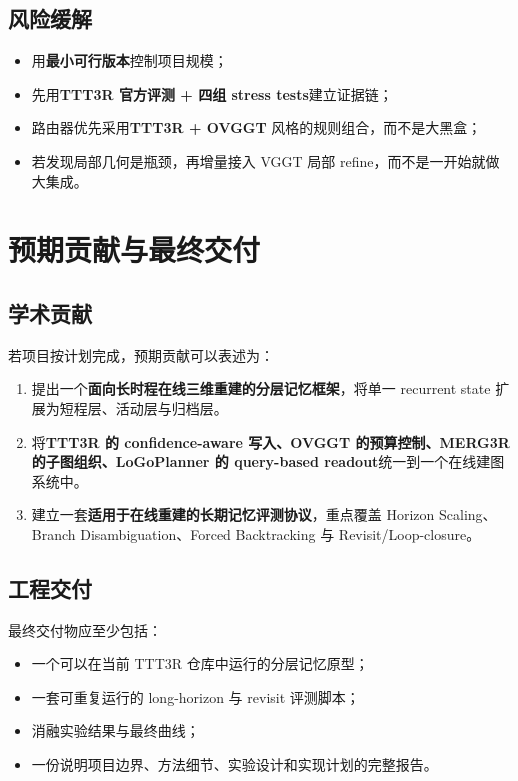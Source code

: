 \documentclass[12pt]{article}
\begin{document}
\subsection{风险缓解}

\begin{itemize}
  \item 用\textbf{最小可行版本}控制项目规模；
  \item 先用\textbf{TTT3R 官方评测 + 四组 stress tests}建立证据链；
  \item 路由器优先采用\textbf{TTT3R + OVGGT} 风格的规则组合，而不是大黑盒；
  \item 若发现局部几何是瓶颈，再增量接入 VGGT 局部 refine，而不是一开始就做大集成。
\end{itemize}

\section{预期贡献与最终交付}

\subsection{学术贡献}

若项目按计划完成，预期贡献可以表述为：
\begin{enumerate}
  \item 提出一个\textbf{面向长时程在线三维重建的分层记忆框架}，将单一 recurrent state 扩展为短程层、活动层与归档层。
  \item 将\textbf{TTT3R 的 confidence-aware 写入、OVGGT 的预算控制、MERG3R 的子图组织、LoGoPlanner 的 query-based readout}统一到一个在线建图系统中。
  \item 建立一套\textbf{适用于在线重建的长期记忆评测协议}，重点覆盖 Horizon Scaling、Branch Disambiguation、Forced Backtracking 与 Revisit/Loop-closure。
\end{enumerate}

\subsection{工程交付}

最终交付物应至少包括：
\begin{itemize}
  \item 一个可以在当前 TTT3R 仓库中运行的分层记忆原型；
  \item 一套可重复运行的 long-horizon 与 revisit 评测脚本；
  \item 消融实验结果与最终曲线；
  \item 一份说明项目边界、方法细节、实验设计和实现计划的完整报告。
\end{itemize}
\end{document}
